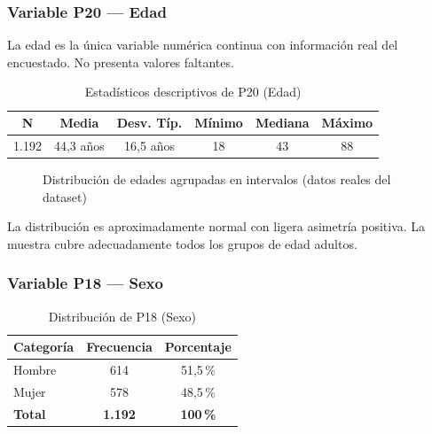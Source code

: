 \documentclass[12pt,a4paper]{article}
\newcommand{\thead}[1]{\cellcolor{tableheader}\color{white}\textbf{#1}}
\begin{document}
\subsubsection{Variable P20 — Edad}

La edad es la única variable numérica continua con información real del encuestado. No presenta valores faltantes.

\begin{table}[H]
\centering
\renewcommand{\arraystretch}{1.3}
\begin{tabular}{cccccc}
\toprule
\thead{N} & \thead{Media} & \thead{Desv. Típ.} & \thead{Mínimo} & \thead{Mediana} & \thead{Máximo} \\
\midrule
1.192 & 44,3 años & 16,5 años & 18 & 43 & 88 \\
\bottomrule
\end{tabular}
\caption{Estadísticos descriptivos de P20 (Edad)}
\end{table}

\begin{figure}[H]
\centering
{}
\caption{Distribución de edades agrupadas en intervalos (datos reales del dataset)}
\end{figure}

La distribución es aproximadamente normal con ligera asimetría positiva. La muestra cubre adecuadamente todos los grupos de edad adultos.

\subsubsection{Variable P18 — Sexo}

\begin{table}[H]
\centering
\renewcommand{\arraystretch}{1.3}
\begin{tabular}{lcc}
\toprule
\thead{Categoría} & \thead{Frecuencia} & \thead{Porcentaje} \\
\midrule
Hombre & 614 & 51,5\,\% \\
\rowcolor{tablerow}
Mujer  & 578 & 48,5\,\% \\
\midrule
\textbf{Total} & \textbf{1.192} & \textbf{100\,\%} \\
\bottomrule
\end{tabular}
\caption{Distribución de P18 (Sexo)}
\end{table}
\end{document}
